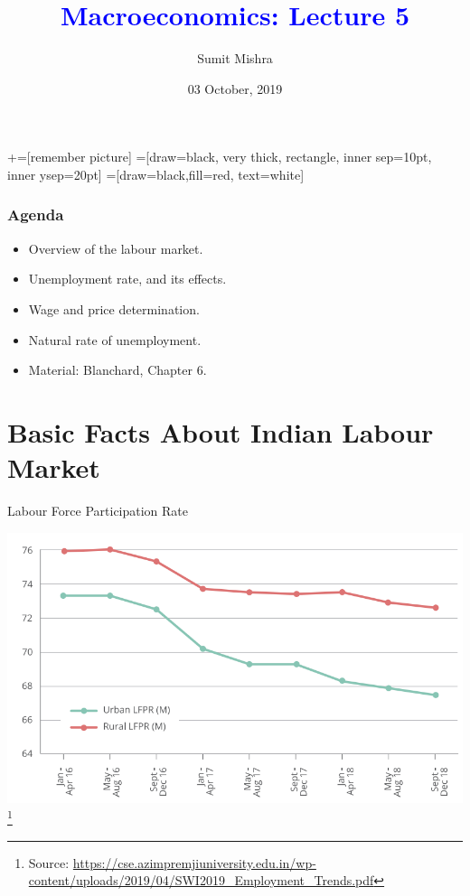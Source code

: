 \documentclass[shownotes,11pt, aspectratio=169]{beamer}
\title[]{\textcolor{blue}{Macroeconomics: Lecture 5}}
\author[SM]{Sumit Mishra}
\institute[IFMR]{\small{\begin{tabular}{c}
IFMR, Sri City \\
\end{tabular}}}
\date{03 October, 2019}
\begin{document}
\newcommand\marktopleft[1]{%
    \tikz[overlay,remember picture] 
        \node (marker-#1-a) at (-.3em,.3em) {};%
}
\newcommand\markbottomright[2]{%
    \tikz[overlay,remember picture] 
        \node (marker-#1-b) at (0em,0em) {};%
}
+=[remember picture] 
 =[draw=black, very thick, rectangle, inner sep=10pt, inner ysep=20pt]
 =[draw=black,fill=red, text=white]

\begin{frame}
\maketitle
\end{frame}

\begin{frame}
\frametitle{Agenda}
\begin{itemize}
\item Overview of the labour market.
\item Unemployment rate, and its effects.
\item Wage and price determination.
\item Natural rate of unemployment.
\item Material: Blanchard, Chapter 6.
\end{itemize}
\end{frame}

\section{Basic Facts About Indian Labour Market}
\begin{frame}{Labour Force Participation Rate}
\begin{center}
\includegraphics[scale=0.5]{graphs/L052019F01.png}
\footnote{Source: \url{https://cse.azimpremjiuniversity.edu.in/wp-content/uploads/2019/04/SWI2019_Employment_Trends.pdf}}
\end{center}
\end{frame}
\end{document}
